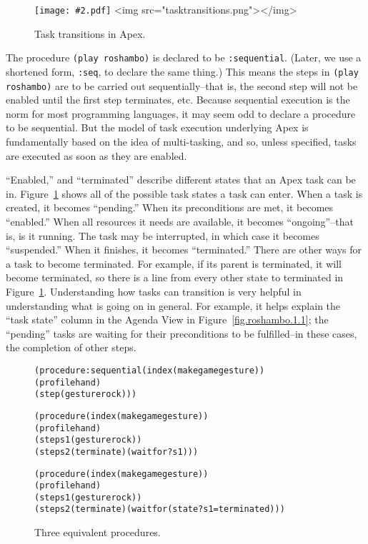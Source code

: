 \documentclass[12pt]{article}
\newcommand{\ic}{\texttt}
\newenvironment{code}%
   {\begin{alltt}}%
   {\end{alltt}}
\newenvironment{float}%
   {\begin{center}}%
   {\end{center}
   }
\newcommand{\img}[2]
 {\texonly \texttt{[image: \#2.pdf]} \endtexonly
  \htmlonly \rawhtml <img src="#2.png"></img>\endrawhtml \endhtmlonly}
\begin{document}
\begin{figure}
\begin{float}
\centerline {
\img{6in}{tasktransitions}
}
\end{float}
\caption{Task transitions in Apex.\label{fig.task-transitions}}
\end{figure}

The procedure  \ic{(play roshambo)} is declared to be \ic{:sequential}. (Later, we use a shortened form, \ic{:seq}, to declare the same thing.) This means the steps in \ic{(play roshambo)} are to be carried out sequentially--that is, the second step will not be enabled until the first step terminates, etc. Because sequential execution is the norm for most programming languages, it may seem odd to declare a procedure to be sequential. But the model of task execution underlying Apex is fundamentally based on the idea of multi-tasking, and so, unless specified, tasks are executed as soon as they are enabled.

``Enabled,'' and ``terminated'' describe different states that an Apex task can be in. Figure~\ref{fig.task-transitions} shows all of the possible task states a task can enter. When a task is created, it becomes ``pending.'' When its preconditions are met, it becomes ``enabled.'' When all resources it needs are available, it becomes ``ongoing''--that is, is it running. The task may be interrupted, in which case it becomes ``suspended.'' When it finishes, it becomes ``terminated.'' There are other ways for a task to become terminated. For example, if its parent is terminated, it will become terminated, so there is a line from every other state to terminated in Figure~\ref{fig.task-transitions}. Understanding how tasks can transition is very helpful in understanding what is going on in general. For example, it helps explain the ``task state'' column in the Agenda View in Figure~\ref{fig.roshambo.1.1}; the ``pending'' tasks are waiting for their preconditions to be fulfilled--in these cases, the completion of other steps.

\begin{figure}
\begin{float}
\begin{code}
(procedure :sequential (index (make game gesture))
  (profile hand)
  (step (gesture rock)))

(procedure (index (make game gesture))
  (profile hand)
  (step s1 (gesture rock))
  (step s2 (terminate) (waitfor ?s1)))
  
  (procedure (index (make game gesture))
  (profile hand)
  (step s1 (gesture rock))
  (step s2 (terminate) (waitfor (state ?s1 = terminated))) 
\end{code}
\end{float}
\caption{Three equivalent procedures.\label{fig.proc.equal}}
\end{figure}
\end{document}
